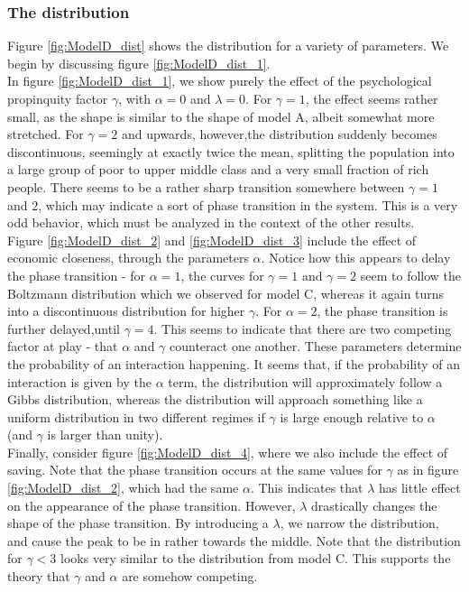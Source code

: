 \documentclass[a4paper, 10pt]{article}
\begin{document}
\subsubsection{The distribution}
Figure \ref{fig:ModelD_dist} shows the distribution for a variety of parameters. We begin by discussing figure \ref{fig:ModelD_dist_1}.\\
\linebreak
In figure \ref{fig:ModelD_dist_1}, we show purely the effect of the psychological propinquity factor $\gamma$, with $\alpha=0$ and $\lambda=0$. For $\gamma=1$, the effect seems rather small, as the shape is similar to the shape of model A, albeit somewhat more stretched. For $\gamma = 2$ and upwards, however,the distribution suddenly becomes discontinuous, seemingly at exactly twice the mean, splitting the population into a large group of poor to upper middle class and a very small fraction of rich people. There seems to be a rather sharp transition somewhere between $\gamma=1$ and $2$, which may indicate a sort of phase transition in the system. This is a very odd behavior, which must be analyzed in the context of the other results.\\
\linebreak
Figure \ref{fig:ModelD_dist_2} and \ref{fig:ModelD_dist_3} include the effect of economic closeness, through the parameters $\alpha$. Notice how this appears to delay the phase transition - for $\alpha=1$, the curves for $\gamma=1$ and $\gamma=2$ seem to follow the Boltzmann distribution which we observed for model C, whereas it again turns into a discontinuous distribution for higher $\gamma$. For $\alpha=2$, the phase transition is further delayed,until $\gamma=4$. This seems to indicate that there are two competing factor at play - that $\alpha$ and $\gamma$ counteract one another. These parameters determine the probability of an interaction happening. It seems that, if the probability of an interaction is given by the $\alpha$ term, the distribution will approximately follow a Gibbs distribution, whereas the distribution will approach something like a uniform distribution in two different regimes if $\gamma$ is large enough relative to $\alpha$ (and $\gamma$ is larger than unity).\\
\linebreak
Finally, consider figure \ref{fig:ModelD_dist_4}, where we also include the effect of saving. Note that the phase transition occurs at the same values for $\gamma$ as in figure \ref{fig:ModelD_dist_2}, which had the same $\alpha$. This indicates that $\lambda$ has little effect on the appearance of the phase transition. However, $\lambda$ drastically changes the shape of the phase transition. By introducing a $\lambda$, we narrow the distribution, and cause the peak to be in rather towards the middle. Note that the distribution for $\gamma < 3$  looks very similar to the distribution from model C. This supports the theory that $\gamma$ and $\alpha$ are somehow competing.\\
\end{document}
